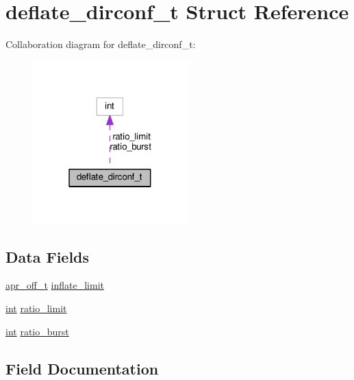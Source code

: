 \hypertarget{structdeflate__dirconf__t}{}\section{deflate\+\_\+dirconf\+\_\+t Struct Reference}
\label{structdeflate__dirconf__t}


Collaboration diagram for deflate\+\_\+dirconf\+\_\+t\+:
\nopagebreak
\begin{figure}[H]
\begin{center}
\leavevmode
\includegraphics[width=171pt]{structdeflate__dirconf__t__coll__graph}
\end{center}
\end{figure}
\subsection*{Data Fields}
\begin{DoxyCompactItemize}
\item 
\hyperlink{group__apr__platform_ga6938af9075cec15c88299109381aa984}{apr\+\_\+off\+\_\+t} \hyperlink{structdeflate__dirconf__t_a61388190747e1bbf2e195e78cf173425}{inflate\+\_\+limit}
\item 
\hyperlink{pcre_8txt_a42dfa4ff673c82d8efe7144098fbc198}{int} \hyperlink{structdeflate__dirconf__t_a7d1a1f466fec237305259171a6588a4a}{ratio\+\_\+limit}
\item 
\hyperlink{pcre_8txt_a42dfa4ff673c82d8efe7144098fbc198}{int} \hyperlink{structdeflate__dirconf__t_ad53c40a9f3e4360c25072f558355c068}{ratio\+\_\+burst}
\end{DoxyCompactItemize}


\subsection{Field Documentation}
